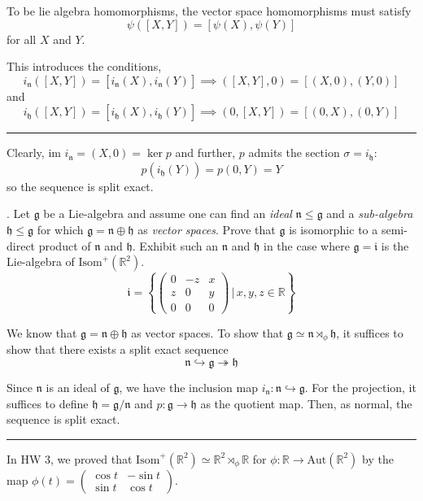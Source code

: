 \documentclass[12pt]{article}
\newcommand{\R}{\mathbb{R}}
\newcommand{\Aut}{\text{Aut}}
\newcommand{\g}{\mathfrak{g}}
\newcommand{\h}{\mathfrak{h}}
\newcommand{\n}{\mathfrak{n}}
\begin{document}
    \color{blue}
        To be lie algebra homomorphisms, the vector space homomorphisms must satisfy 
        \[\psi([X, Y]) = [\psi(X), \psi(Y)]\]
        for all $X$ and $Y$. 

        This introduces the conditions, 
        \[i_{\n}([X, Y]) = [i_{\n}(X), i_{\n}(Y)] \implies ([X, Y], 0) = [(X, 0), (Y, 0)]\]
        and 
        \[i_{\h}([X, Y]) = [i_{\h}(X), i_{\h}(Y)] \implies (0, [X, Y]) = [(0, X), (0, Y)]\]

        \vspace*{10pt}
        \hrule
        \vspace*{10pt}

        Clearly, $\text{im } i_{\n} = (X, 0) = \ker p$ and further, $p$ admits the section $\sigma = i_{\h}$: 
        \[p(i_{\h}(Y)) = p(0, Y) = Y\]
        so the sequence is split exact.
    \color{black}


.  Let $\g$ be a Lie-algebra and assume one can find an \emph{ideal} $\n \leq \g$ and a \emph{sub-algebra} $\h \leq \g$ for which $\g = \n \oplus \h$ as \emph{vector spaces}.  Prove that $\g$ is isomorphic to a semi-direct product of $\n$ and $\h$.  Exhibit such an $\n$ and $\h$ in the case where $\g = \mathfrak{i}$ is the Lie-algebra of $\text{Isom}^{+}(\R^{2})$.  
\[
\mathfrak{i} = \left\{ \left( 
\begin{array}{ccc}
0 & -z & x \\
z & 0 & y \\
0 & 0 & 0
\end{array}
\right) \, \Bigg| \, x,y,z  \in \R \right\}
\]

    \color{blue}
        We know that $\g = \n \oplus \h$ as vector spaces. To show that $\g \simeq \n \rtimes_{\phi} \h$, it suffices to show that there exists a split exact sequence 
        \[\n \hookrightarrow \g \twoheadrightarrow \h\]

        Since $\n$ is an ideal of $\g$, we have the inclusion map $i_{\n}: \n \hookrightarrow \g$. For the projection, it suffices to define $\h = \g/\n$ and $p: \g \to \h$ as the quotient map. Then, as normal, the sequence is split exact.

        \vspace*{10pt}
        \hrule
        \vspace*{10pt}

        In HW 3, we proved that $\text{Isom}^+(\R^2) \simeq \R^2 \rtimes_{\phi} \R$ for $\phi: \R \to \Aut(\R^2)$ by the map $\phi(t) = \begin{pmatrix}
            \cos t & -\sin t\\
            \sin t & \cos t
        \end{pmatrix}$.
\end{document}
